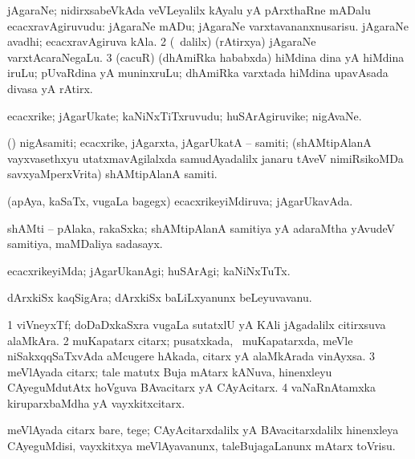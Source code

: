 \bentry
{} 
\gl{\nA}
\expl{}
\bmng
\bnum
{} 
\banum
{} jAgaraNe; nidirxsabeVkAda veVLeyalilx kAyalu yA pArxthaRne mADalu ecacxravAgiruvudu:  jAgaraNe mADu; jAgaraNe varxtavananxnusarisu. 
 jAgaraNe avadhi; ecacxravAgiruva kAla. 
\eanum
\numie
\num{2} (\sA\ \bava dalilx) (rAtirxya) jAgaraNe varxtAcaraNegaLu. 
\num{3} (cacuR) (dhAmiRka hababxda) hiMdina dina yA hiMdina iruLu; pUvaRdina yA muninxruLu; dhAmiRka varxtada hiMdina upavAsada divasa yA rAtirx. 
\enum
\emng
\eentry

\bentry
{} 
\gl{\nA}
\expl{}
\bmng
ecacxrike; jAgarUkate; kaNiNxTiTxruvudu; huSArAgiruvike; nigAvaNe. 
\emng
\eentry

\bentry
{}
\gl{\nA}
\expl{}
\bmng
 (\ame) nigAsamiti; ecacxrike, jAgarxta, jAgarUkatA -- samiti; (shAMtipAlanA vayxvasethxyu utatxmavAgilalxda samudAyadalilx janaru tAveV nimiRsikoMDa savxyaMperxVrita) shAMtipAlanA samiti. 
\emng
\eentry

\bentry
{} 
\gl{\gu}
\expl{}
\bmng
 (apAya, kaSaTx, \mo vugaLa bagegx) ecacxrikeyiMdiruva; jAgarUkavAda. 
\emng
\eentry

\bentry
{} 
\gl{\nA}
\expl{}
\bmng
 shAMti -- pAlaka, rakaSxka; shAMtipAlanA samitiya yA adaraMtha yAvudeV samitiya, maMDaliya sadasayx. 
\emng
\eentry

\bentry
{} 
\gl{\kirxvi}
\expl{}
\bmng
 ecacxrikeyiMda; jAgarUkanAgi; huSArAgi; kaNiNxTuTx. 
\emng
\eentry

\bentry
{} 
\gl{\nA}
\expl{}
\bmng
 dArxkiSx kaqSigAra; dArxkiSx baLiLxyanunx beLeyuvavanu. 
\emng
\eentry

\bentry
{} 
\gl{\nA}
\expl{}
\bmng
\bnum
\num{1} viVneyxTf; doDaDxkaSxra \mo vugaLa sutatxlU yA KAli jAgadalilx citirxsuva alaMkAra. 
\num{2} muKapatarx citarx; pusatxkada, \kanmu\ muKapatarxda, meVle niSakxqqSaTxvAda aMcugere hAkada, citarx yA alaMkArada vinAyxsa. 
\num{3} meVlAyada citarx; tale matutx Buja mAtarx kANuva, hinenxleyu CAyeguMdutAtx hoVguva BAvacitarx yA CAyAcitarx. 
\num{4} vaNaRnAtamxka kiruparxbaMdha yA vayxkitxcitarx. 
\enum
\emng
\eentry

\bentry
{} 
\gl{\sakirx}
\expl{}
\bmng
 meVlAyada citarx bare, tege; CAyAcitarxdalilx yA BAvacitarxdalilx hinenxleya CAyeguMdisi, vayxkitxya meVlAyavanunx, taleBujagaLanunx mAtarx toVrisu. 
\emng
\eentry

